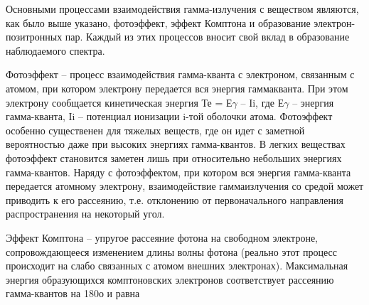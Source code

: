 Основными процессами взаимодействия гамма-излучения с веществом являются, как
было выше указано, фотоэффект, эффект Комптона и образование
электрон-позитронных пар. Каждый из этих процессов вносит свой вклад в
образование наблюдаемого спектра.

Фотоэффект – процесс взаимодействия гамма-кванта с электроном, связанным с
атомом, при котором электрону передается вся энергия гаммакванта. При этом
электрону сообщается кинетическая энергия Те = Е$\gamma$ – Ii, где Е$\gamma$ –
энергия гамма-кванта, Ii – потенциал ионизации i-той оболочки атома. Фотоэффект
особенно существенен для тяжелых веществ, где он идет с заметной вероятностью
даже при высоких энергиях гамма-квантов. В легких веществах фотоэффект
становится заметен лишь при относительно небольших энергиях гамма-квантов.
Наряду с фотоэффектом, при котором вся энергия гамма-кванта передается атомному
электрону, взаимодействие гаммаизлучения со средой может приводить к его
рассеянию, т.е. отклонению от первоначального направления распространения на
некоторый угол.

Эффект Комптона – упругое рассеяние фотона на свободном электроне,
сопровождающееся изменением длины волны фотона (реально этот процесс происходит
на слабо связанных с атомом внешних электронах). Максимальная энергия
образующихся комптоновских электронов соответствует рассеянию гамма-квантов на
180о и равна
